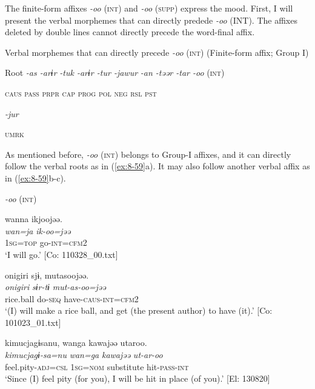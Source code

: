 The finite-form affixes \textit{-oo} (\textsc{int}) and \textit{-oo} (\textsc{supp}) express the mood. First, I will present the verbal morphemes that can directly predede \textit{-oo} (INT). The affixes deleted by double lines cannot directly precede the word-final affix.

\ea\label{ex:8-58}
  Verbal morphemes that can directly precede \textit{-oo} (\textsc{int}) (Finite-form affix; Group I)

  Root  \textit{-as  -arɨr} %
\textit{-tuk  -arɨr  -tur  -jawur} %
\textit{-an  -təər  -tar  -oo} (\textsc{int})

    \textsc{caus}  \textsc{pass}  \textsc{prpr}  \textsc{cap}  \textsc{prog}  \textsc{pol}  \textsc{neg}  \textsc{rsl}  \textsc{pst}

          \textit{-jur}

          \textsc{umrk}
\z

As mentioned before, \textit{-oo} (\textsc{int}) belongs to Group-I affixes, and it can directly follow the verbal roots as in (\ref{ex:8-59}a). It may also follow another verbal affix as in (\ref{ex:8-59}b-c).

\ea\label{ex:8-59}
  \textit{-oo} (\textsc{int})

\ea
{\US}
\glll   wanna  ikjoojəə.\\
\textit{wan=ja}  \textit{ik-oo=jəə}\\
1\textsc{sg}=\textsc{top}  go-\textsc{int}=\textsc{cfm2}\\
\glt ‘I will go.’ [Co: 110328\_00.txt]

\ex
{\TM}
\glll  {\textbar}onigiri{\textbar}  sjɨ,  mutasoojəə.\\
\textit{onigiri}  \textit{sɨr-tɨ}  \textit{mut-as-oo=jəə}\\
rice.ball  do-\textsc{seq}  have-\textsc{caus}-\textsc{int}=\textsc{cfm2}\\
\glt ‘(I) will make a rice ball, and get (the present author) to have (it).’ [Co: 101023\_01.txt]

\ex
{\TM}
\glll  kimucjagɨsanu,  wanga  kawajəə  utaroo.\\
\textit{kimucjagɨ-sa=nu}  \textit{wan=ga}  \textit{kawajəə}  \textit{ut-ar-oo}\\
feel.pity-\textsc{adj}=\textsc{csl}  1\textsc{sg}=\textsc{nom}  substitute  hit-\textsc{pass}-\textsc{int}\\
\glt ‘Since (I) feel pity (for you), I will be hit in place (of you).’ [El: 130820]
\z
\z

